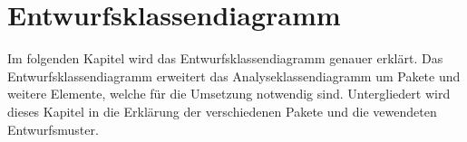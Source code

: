 \chapter{Entwurfsklassendiagramm}

Im folgenden Kapitel wird das Entwurfsklassendiagramm genauer erklärt. Das Entwurfsklassendiagramm erweitert das Analyseklassendiagramm um Pakete und weitere Elemente, welche für die Umsetzung notwendig sind. Untergliedert wird dieses Kapitel in die Erklärung der verschiedenen Pakete und die vewendeten Entwurfsmuster.

